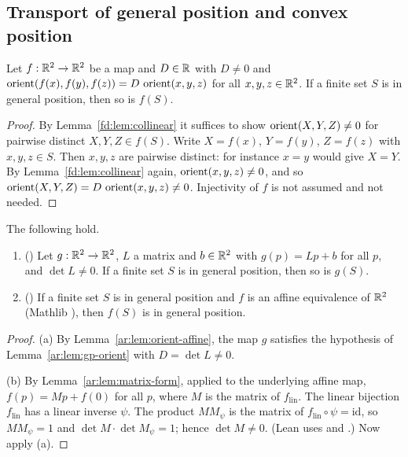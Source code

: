 \subsection{Transport of general position and convex position}

\begin{lemma}\label{ar:lem:gp-orient}
Let $f:\mathbb R^2\to\mathbb R^2$ be a map and $D\in\mathbb R$ with $D\ne0$ and $\operatorname{orient}(f(x),f(y),f(z))=D\,\operatorname{orient}(x,y,z)$ for all
$x,y,z\in\mathbb R^2$. If a finite set $S$ is in general position, then so is $f(S)$.
\end{lemma}

\begin{proof}
By Lemma~\ref{fd:lem:collinear} it suffices to show $\operatorname{orient}(X,Y,Z)\ne0$ for pairwise distinct $X,Y,Z\in f(S)$. Write
$X=f(x)$, $Y=f(y)$, $Z=f(z)$ with $x,y,z\in S$. Then $x,y,z$ are pairwise distinct: for instance $x=y$ would give
$X=Y$. By Lemma~\ref{fd:lem:collinear} again, $\operatorname{orient}(x,y,z)\ne0$, and so
$\operatorname{orient}(X,Y,Z)=D\,\operatorname{orient}(x,y,z)\ne0$. Injectivity of $f$ is not assumed and not needed.
\end{proof}

\begin{lemma}\label{ar:lem:gp-affine}
The following hold.
\begin{enumerate}[label=\textup{(\alph*)}]
\item \textup{(}\textup{)} Let $g:\mathbb R^2\to\mathbb R^2$, $L$ a matrix and $b\in\mathbb R^2$ with
$g(p)=Lp+b$ for all $p$, and $\det L\ne0$. If a finite set $S$ is in general position, then so is $g(S)$.
\item \textup{(}\textup{)} If a finite set $S$ is in general position and $f$
is an affine equivalence of $\mathbb R^2$ \textup(Mathlib \textup), then $f(S)$ is in general position.
\end{enumerate}
\end{lemma}

\begin{proof}
(a) By Lemma~\ref{ar:lem:orient-affine}, the map $g$ satisfies the hypothesis of Lemma~\ref{ar:lem:gp-orient} with
$D=\det L\ne0$.

(b) By Lemma~\ref{ar:lem:matrix-form}, applied to the underlying affine map, $f(p)=Mp+f(0)$ for all $p$, where $M$ is
the matrix of $f_{\mathrm{lin}}$. The linear bijection $f_{\mathrm{lin}}$ has a linear inverse $\psi$. The product $MM_\psi$
is the matrix of $f_{\mathrm{lin}}\circ\psi=\mathrm{id}$, so $MM_\psi=1$ and $\det M\cdot\det M_\psi=1$; hence $\det
M\ne0$. (Lean uses  and .) Now apply (a).
\end{proof}

